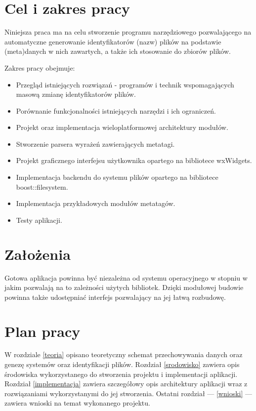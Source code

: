 \section{Cel i zakres pracy}
\par
Niniejsza praca ma na celu stworzenie programu narzędziowego pozwalającego na automatyczne generowanie identyfikatorów (nazw) plików na podstawie (meta)danych w nich zawartych, a także ich stosowanie do zbiorów plików.

\par
Zakres pracy obejmuje:
\begin{itemize}
\item Przegląd istniejących rozwiązań - programów i technik wspomagających masową zmianę identyfikatorów plików.
\item Porównanie funkcjonalności istniejących narzędzi i ich ograniczeń.
\item Projekt oraz implementacja wieloplatformowej architektury modułów.
\item Stworzenie parsera wyrażeń zawierających metatagi.
\item Projekt graficznego interfejsu użytkownika opartego na bibliotece wxWidgets.
\item Implementacja backendu do systemu plików opartego na bibliotece boost::filesystem.
\item Implementacja przykładowych modułów metatagów.
\item Testy aplikacji.
\end{itemize}

\section{Założenia}
\label{zalozenia}
Gotowa aplikacja powinna być niezależna od systemu operacyjnego w stopniu w jakim pozwalają na to zależności użytych bibliotek. Dzięki modułowej budowie powinna także udostępniać interfejs pozwalający na jej łatwą rozbudowę.

\section{Plan pracy}
\label{plan-pracy}
W rozdziale \ref{teoria} opisano teoretyczny schemat przechowywania danych oraz genezę systemów oraz identyfikacji plików. Rozdział \ref{srodowisko} zawiera opis środowiska wykorzystanego do stworzenia projektu i implementacji aplikacji.
Rozdział \ref{implementacja} zawiera szczegółowy opis architektury aplikacji wraz z rozwiązaniami wykorzystanymi do jej stworzenia.
Ostatni rozdział --- \ref{wnioski} --- zawiera wnioski na temat wykonanego projektu.

\clearpage
